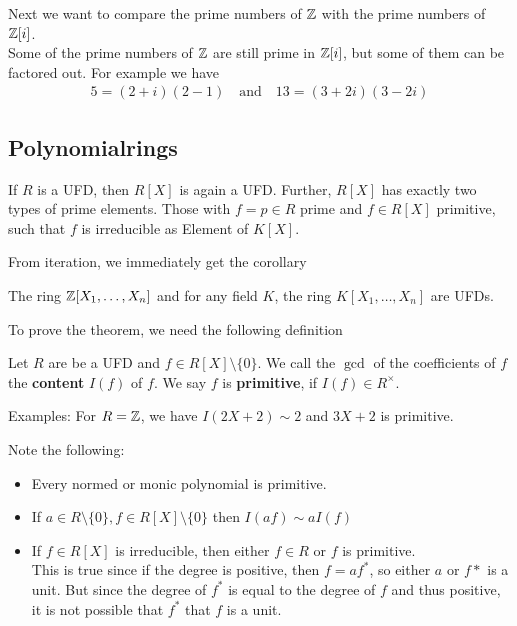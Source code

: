 Next we want to compare the prime numbers of $\mathbb{Z}$ with the prime numbers of $\mathbb{Z}[i]$.\\

Some of the prime numbers of $\mathbb{Z}$ are still prime in $\mathbb{Z}[i]$, but some of them can be factored out. For example we have
\begin{align*}
	5 = (2 + i)(2-1) \quad \text{and} \quad 13 = (3 + 2i)(3 - 2i)
\end{align*}


\subsection{Polynomialrings}

\begin{theorem}[Gauss]
	If $R$ is a UFD, then $R[X]$ is again a UFD. Further, $R[X]$ has exactly two types of prime elements. Those with $f = p \in R$ prime and $f \in R[X]$ primitive, such that $f$ is irreducible as Element of $K[X]$.
\end{theorem}
From iteration, we immediately get the corollary 
\begin{corollary}[]
	The ring $\mathbb{Z}[X_1, \ldots, X_n]$ and for any field $K$, the ring $K[X_1, \ldots, X_n]$ are UFDs.
\end{corollary}
To prove the theorem, we need the following definition
\begin{definition}[]
	Let $R$ are be a UFD and $f \in R[X] \setminus \{0\}$. We call the $\gcd$ of the coefficients of $f$ the \textbf{content} $I(f)$ of $f$. We say $f$ is \textbf{primitive}, if $I(f) \in R^{\times}$.
\end{definition}
Examples: For $R = \mathbb{Z}$, we have $I(2X + 2) \sim 2$ and $3X + 2$ is primitive.

Note the following:
\begin{itemize}
\item Every normed or monic polynomial is primitive.
\item If $a \in R \setminus \{0\}, f \in R[X] \setminus \{0\}$ then $I(af) \sim a I(f)$
\item If $f \in R[X]$ is irreducible, then either $f \in R$ or $f$ is primitive.\\
	This is true since if the degree is positive, then $f = a f^*$, so either $a$ or $f*$ is a unit. But since the degree of $f^*$ is equal to the degree of $f$ and thus positive, it is not possible that $f^*$ that $f$ is a unit.
\end{itemize}

